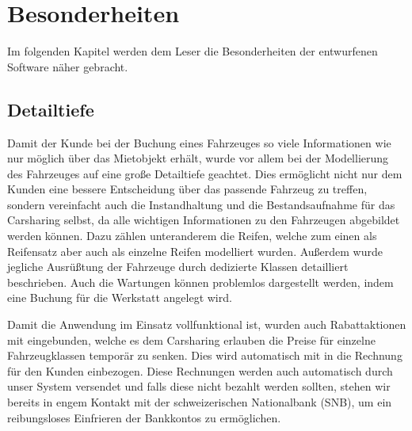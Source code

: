 \chapter{Besonderheiten}
Im folgenden Kapitel werden dem Leser die Besonderheiten der entwurfenen Software näher gebracht.

\section{Detailtiefe}
Damit der Kunde bei der Buchung eines Fahrzeuges so viele Informationen wie nur möglich über das Mietobjekt erhält, wurde vor allem bei der Modellierung des Fahrzeuges auf eine große Detailtiefe geachtet. Dies ermöglicht nicht nur dem Kunden eine bessere Entscheidung über das passende Fahrzeug zu treffen, sondern vereinfacht auch die Instandhaltung und die Bestandsaufnahme für das Carsharing selbst, da alle wichtigen Informationen zu den Fahrzeugen abgebildet werden können. Dazu zählen unteranderem die Reifen, welche zum einen als Reifensatz aber auch als einzelne Reifen modelliert wurden. Außerdem wurde jegliche Ausrüßtung der Fahrzeuge durch dedizierte Klassen detailliert beschrieben. Auch die Wartungen können problemlos dargestellt werden, indem eine Buchung für die Werkstatt angelegt wird.

Damit die Anwendung im Einsatz vollfunktional ist, wurden auch Rabattaktionen mit eingebunden, welche es dem Carsharing erlauben die Preise für einzelne Fahrzeugklassen temporär zu senken. Dies wird automatisch mit in die Rechnung für den Kunden einbezogen. Diese Rechnungen werden auch automatisch durch unser System versendet und falls diese nicht bezahlt werden sollten, stehen wir bereits in engem Kontakt mit der schweizerischen Nationalbank (SNB), um ein reibungsloses Einfrieren der Bankkontos zu ermöglichen.

\newpage

